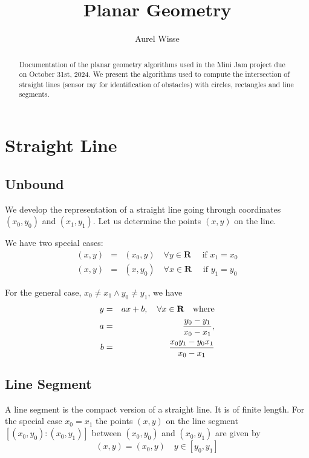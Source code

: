 \documentclass[11pt]{article}
\newcommand{\Rb}{{\mathbf{R}}}
\begin{document}
%
%
\title{Planar Geometry}
\author{Aurel Wisse}
\maketitle
%
%
\begin{abstract}
Documentation of the planar geometry algorithms used in the
Mini Jam project due on October 31st, 2024. We present the algorithms used to
compute the intersection of straight lines (sensor ray for identification
of obstacles) with circles, rectangles and line segments.
\end{abstract}

%
\section{Straight Line}
\label{sec-straight-line}

\subsection{Unbound}
\label{sec:unbound}
We develop the representation of a straight line going through
coordinates $(x_0, y_0)$ and $(x_1, y_1)$. Let us determine the points $(x,
y)$ on the line.

We have two special cases:
\begin{eqnarray}
    (x, y) &=& (x_0, y)\quad\forall y\in\Rb\quad \text{ if } x_1 = x_0
    \label{eq-line-xx0} \\
    (x, y) &=& (x, y_0)\quad\forall x\in\Rb\quad \text{ if } y_1 = y_0
    \label{eq-line-yy0}
\end{eqnarray}

For the general case, $x_0 \neq x_1 \land y_0 \neq y_1$, we have
\begin{eqnarray}
    y &=& ax+b,\quad \forall x\in\Rb\quad \text{where}\label{eq-line-general}\\
    a &=& \frac{y_0 - y_1}{x_0 - x_1}, \notag \\
    b &=& \frac{x_0 y_1 - y_0 x_1}{x_0 - x_1} \notag
\end{eqnarray}

\subsection{Line Segment}
\label{sec-line-segment}
A line segment is the compact version of a straight line. It is of finite
length. For the special case $x_0 = x_1$ the points $(x, y)$ on the line
segment $[(x_0, y_0):(x_0, y_1)]$ between $(x_0, y_0)$ and $(x_0, y_1)$ are
given by
\begin{equation}
    (x, y) = (x_0, y)\quad y\in [y_0, y_1]\label{eq-seg-x1x0}
\end{equation}
\end{document}
